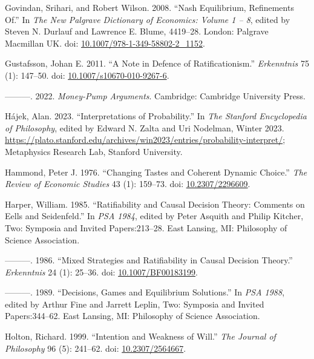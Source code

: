 \documentclass[
  10pt,
  letterpaper,
  DIV=11,
  numbers=noendperiod,
  twoside]{scrartcl}
\newlength{\cslhangindent}
\newenvironment{CSLReferences}[2] %
 {\begin{list}{}{%
  \setlength{\itemindent}{0pt}
  \setlength{\leftmargin}{0pt}
  \setlength{\parsep}{0pt}
  \ifodd #1
   \setlength{\leftmargin}{\cslhangindent}
   \setlength{\itemindent}{-1\cslhangindent}
  \fi
  \setlength{\itemsep}{#2\baselineskip}}}
 {\end{list}}
\begin{document}
\begin{CSLReferences}{1}{0}
Govindan, Srihari, and Robert Wilson. 2008. {``Nash Equilibrium,
Refinements Of.''} In \emph{The New Palgrave Dictionary of Economics:
Volume 1 -- 8}, edited by Steven N. Durlauf and Lawrence E. Blume,
4419--28. London: Palgrave Macmillan UK. doi:
\href{https://doi.org/10.1007/978-1-349-58802-2_1152}{10.1007/978-1-349-58802-2\_1152}.

Gustafsson, Johan E. 2011. {``A Note in Defence of Ratificationism.''}
\emph{Erkenntnis} 75 (1): 147--50. doi:
\href{https://doi.org/10.1007/s10670-010-9267-6}{10.1007/s10670-010-9267-6}.

---------. 2022. \emph{Money-Pump Arguments}. Cambridge: Cambridge
University Press.

Hájek, Alan. 2023. {``{Interpretations of Probability}.''} In \emph{The
{Stanford} Encyclopedia of Philosophy}, edited by Edward N. Zalta and
Uri Nodelman, {W}inter 2023.
\url{https://plato.stanford.edu/archives/win2023/entries/probability-interpret/};
Metaphysics Research Lab, Stanford University.

Hammond, Peter J. 1976. {``Changing Tastes and Coherent Dynamic
Choice.''} \emph{The Review of Economic Studies} 43 (1): 159--73. doi:
\href{https://doi.org/10.2307/2296609}{10.2307/2296609}.

Harper, William. 1985. {``Ratifiability and Causal Decision Theory:
Comments on Eells and Seidenfeld.''} In \emph{PSA 1984}, edited by Peter
Asquith and Philip Kitcher, Two: Symposia and Invited Papers:213--28.
East Lansing, MI: Philosophy of Science Association.

---------. 1986. {``Mixed Strategies and Ratifiability in Causal
Decision Theory.''} \emph{Erkenntnis} 24 (1): 25--36. doi:
\href{https://doi.org/10.1007/BF00183199}{10.1007/BF00183199}.

---------. 1989. {``Decisions, Games and Equilibrium Solutions.''} In
\emph{PSA 1988}, edited by Arthur Fine and Jarrett Leplin, Two: Symposia
and Invited Papers:344--62. East Lansing, MI: Philosophy of Science
Association.

Holton, Richard. 1999. {``Intention and Weakness of Will.''} \emph{The
Journal of Philosophy} 96 (5): 241--62. doi:
\href{https://doi.org/10.2307/2564667}{10.2307/2564667}.


\end{CSLReferences}
\end{document}
